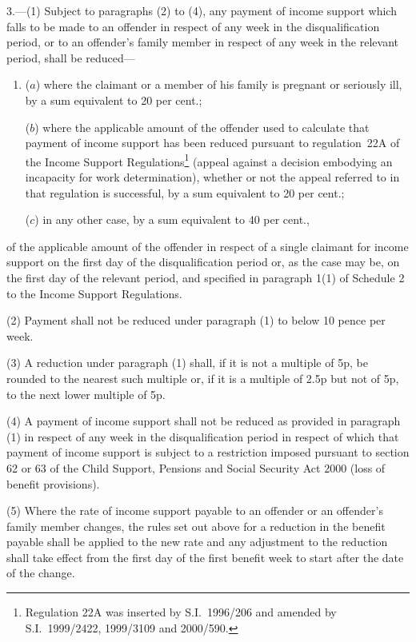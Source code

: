 \documentclass[12pt,a4paper]{article}
\begin{document}
3.---(1)  Subject to paragraphs (2) to (4), any payment of income support which falls to be made to an offender in respect of any week in the disqualification period, or to an offender’s family member in respect of any week in the relevant period, shall be reduced—
\begin{enumerate}\item[]
($a$) where the claimant or a member of his family is pregnant or seriously ill, by a sum equivalent to 20 per cent.;

($b$) where the applicable amount of the offender used to calculate that payment of income support has been reduced pursuant to regulation~22A of the Income Support Regulations\footnote{Regulation 22A was inserted by S.I.~1996/206 and amended by S.I.~1999/2422, 1999/3109 and 2000/590.} (appeal against a decision embodying an incapacity for work determination), whether or not the appeal referred to in that regulation is successful, by a sum equivalent to 20 per cent.;

($c$) in any other case, by a sum equivalent to 40 per cent.,
\end{enumerate}
of the applicable amount of the offender in respect of a single claimant for income support on the first day of the disqualification period or, as the case may be, on the first day of the relevant period, and specified in paragraph 1(1) of Schedule 2 to the Income Support Regulations.

(2) Payment shall not be reduced under paragraph (1) to below 10 pence per week.

(3) A reduction under paragraph (1) shall, if it is not a multiple of 5p, be rounded to the nearest such multiple or, if it is a multiple of 2$.$5p but not of 5p, to the next lower multiple of 5p.

(4) A payment of income support shall not be reduced as provided in paragraph (1) in respect of any week in the disqualification period in respect of which that payment of income support is subject to a restriction imposed pursuant to section 62 or 63 of the Child Support, Pensions and Social Security Act 2000 (loss of benefit provisions).

(5) Where the rate of income support payable to an offender or an offender’s family member changes, the rules set out above for a reduction in the benefit payable shall be applied to the new rate and any adjustment to the reduction shall take effect from the first day of the first benefit week to start after the date of the change.
\end{document}
